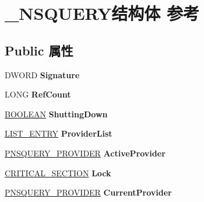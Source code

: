 \hypertarget{struct___n_s_q_u_e_r_y}{}\section{\+\_\+\+N\+S\+Q\+U\+E\+R\+Y结构体 参考}
\label{struct___n_s_q_u_e_r_y}
\subsection*{Public 属性}
\begin{DoxyCompactItemize}
\item 
\mbox{\label{struct___n_s_q_u_e_r_y_a411b0f38424e7075bd7edbd2a4f00bae}} 
D\+W\+O\+RD {\bfseries Signature}
\item 
\mbox{\label{struct___n_s_q_u_e_r_y_abe66ec1908f2cb880ecc3420238febe2}} 
L\+O\+NG {\bfseries Ref\+Count}
\item 
\mbox{\label{struct___n_s_q_u_e_r_y_a13708531060131593ff56f590e9dc071}} 
\hyperlink{_processor_bind_8h_a112e3146cb38b6ee95e64d85842e380a}{B\+O\+O\+L\+E\+AN} {\bfseries Shutting\+Down}
\item 
\mbox{\label{struct___n_s_q_u_e_r_y_a03b113e4b710249546c079cd80aee8b6}} 
\hyperlink{struct___l_i_s_t___e_n_t_r_y}{L\+I\+S\+T\+\_\+\+E\+N\+T\+RY} {\bfseries Provider\+List}
\item 
\mbox{\label{struct___n_s_q_u_e_r_y_a8986a08fa8ac25b31ded1dd09a4c62a2}} 
\hyperlink{struct___n_s_q_u_e_r_y___p_r_o_v_i_d_e_r}{P\+N\+S\+Q\+U\+E\+R\+Y\+\_\+\+P\+R\+O\+V\+I\+D\+ER} {\bfseries Active\+Provider}
\item 
\mbox{\label{struct___n_s_q_u_e_r_y_a5805fb7aa25750bf6f2a6c7720808704}} 
\hyperlink{struct___c_r_i_t_i_c_a_l___s_e_c_t_i_o_n}{C\+R\+I\+T\+I\+C\+A\+L\+\_\+\+S\+E\+C\+T\+I\+ON} {\bfseries Lock}
\item 
\mbox{\label{struct___n_s_q_u_e_r_y_a60917e8278b538c1529591c9429c9844}} 
\hyperlink{struct___n_s_q_u_e_r_y___p_r_o_v_i_d_e_r}{P\+N\+S\+Q\+U\+E\+R\+Y\+\_\+\+P\+R\+O\+V\+I\+D\+ER} {\bfseries Current\+Provider}
\item 

\end{DoxyCompactItemize}
